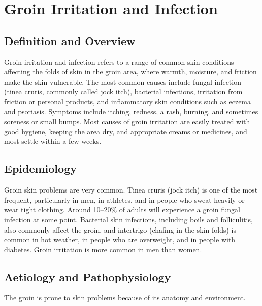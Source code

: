 \chapter{Groin Irritation and Infection}

\section*{Definition and Overview}
Groin irritation and infection refers to a range of common skin conditions affecting the folds of skin in the groin area, where warmth, moisture, and friction make the skin vulnerable. The most common causes include fungal infection (tinea cruris, commonly called jock itch), bacterial infections, irritation from friction or personal products, and inflammatory skin conditions such as eczema and psoriasis. Symptoms include itching, redness, a rash, burning, and sometimes soreness or small bumps. Most causes of groin irritation are easily treated with good hygiene, keeping the area dry, and appropriate creams or medicines, and most settle within a few weeks.

\section*{Epidemiology}
Groin skin problems are very common. Tinea cruris (jock itch) is one of the most frequent, particularly in men, in athletes, and in people who sweat heavily or wear tight clothing. Around 10--20\% of adults will experience a groin fungal infection at some point. Bacterial skin infections, including boils and folliculitis, also commonly affect the groin, and intertrigo (chafing in the skin folds) is common in hot weather, in people who are overweight, and in people with diabetes. Groin irritation is more common in men than women.

\section*{Aetiology and Pathophysiology}
The groin is prone to skin problems because of its anatomy and environment.


